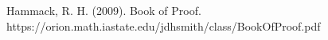 \documentclass[sigconf]{article}
\begin{document}
Hammack, R. H. (2009). Book of Proof. https://orion.math.iastate.edu/jdhsmith/class/BookOfProof.pdf



\end{document}
